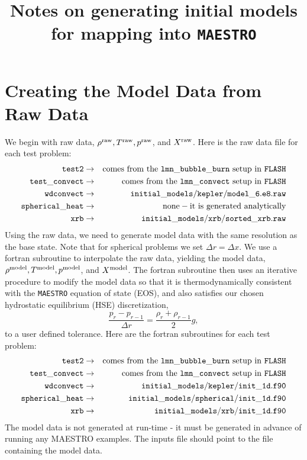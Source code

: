 \documentclass[11pt]{article}
\title{Notes on generating initial models for mapping into {\tt MAESTRO}}
\def\model {\rm model}
\def\raw   {\rm raw}
\begin{document}
\maketitle
\tableofcontents

\clearpage

\section{Creating the Model Data from Raw Data}\label{Sec:Creating the Model Data from Raw Data}
We begin with raw data, $\rho^{\raw}, T^{\raw}, p^{\raw}$, and $X^{\raw}$.  Here is the raw data file for each test problem:
\begin{eqnarray}
{\tt test2} & \rightarrow & \mathrm{comes~from~the~ {\tt lmn\_bubble\_burn}~setup~in~ {\tt FLASH}} \nonumber \\
{\tt test\_convect} & \rightarrow & \mathrm{comes~from~the~ {\tt lmn\_convect}~setup~in~ {\tt FLASH}} \nonumber \\
{\tt wdconvect} & \rightarrow & {\tt initial\_models/kepler/model\_6.e8.raw} \nonumber \\
{\tt spherical\_heat} & \rightarrow & \mathrm{none-it~ is~ generated~ analytically} \nonumber \\
{\tt xrb} & \rightarrow & {\tt initial\_models/xrb/sorted\_xrb.raw} \nonumber
\end{eqnarray}
Using the raw data, we need to generate model data with the same resolution as the base state.  Note that for spherical problems we set $\Delta r = \Delta x$.  We use a fortran subroutine to interpolate the raw data, yielding the model data, $\rho^{\model}, T^{\model}, p^{\model}$, and $X^{\model}$.  The fortran subroutine then uses an iterative procedure to modify the model data so that it is thermodynamically consistent with the {\tt MAESTRO} equation of state (EOS), and also satisfies our chosen hydrostatic equilibrium (HSE) discretization,
\begin{equation}
\frac{p_r - p_{r-1}}{\Delta r} = \frac{\rho_r + \rho_{r-1}}{2}g,\label{HSE Discretization}
\end{equation}
to a user defined tolerance.  Here are the fortran subroutines for each test problem:
\begin{eqnarray}
{\tt test2} & \rightarrow & \mathrm{comes~from~the~ {\tt lmn\_bubble\_burn}~setup~in~ {\tt FLASH}} \nonumber \\
{\tt test\_convect} & \rightarrow & \mathrm{comes~from~the~ {\tt lmn\_convect}~setup~in~ {\tt FLASH}} \nonumber \\
{\tt wdconvect} & \rightarrow & {\tt initial\_models/kepler/init\_1d.f90} \nonumber \\
{\tt spherical\_heat} & \rightarrow & {\tt initial\_models/spherical/init\_1d.f90} \nonumber \\
{\tt xrb} & \rightarrow & {\tt initial\_models/xrb/init\_1d.f90} \nonumber
\end{eqnarray}
The model data is not generated at run-time - it must be generated in advance of running any MAESTRO examples.  The inputs file should point to the file containing the model data.
\end{document}

